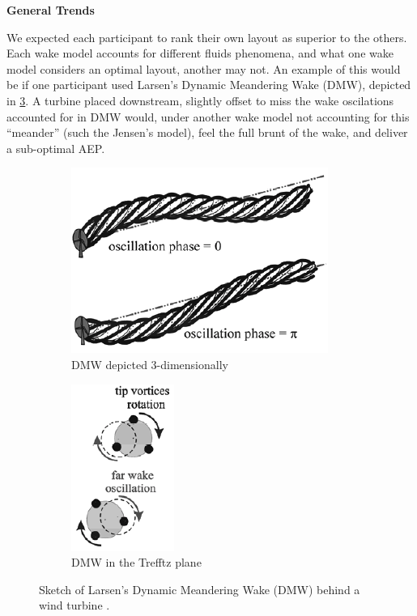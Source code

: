 \noindent\textbf{General Trends}\newline

	We expected each participant to rank their own layout as superior to the others.
	Each wake model accounts for different fluids phenomena, and what one wake model considers an optimal layout, another may not.
	An example of this would be if one participant used Larsen's Dynamic Meandering Wake (DMW)\cite{Larsen2007}, depicted in \cref{fig:dmw}.
	A turbine placed downstream, slightly offset to miss the wake oscilations accounted for in DMW would, under another wake model not accounting for this ``meander'' (such the Jensen's model\cite{Jensen1983}), feel the full brunt of the wake, and deliver a sub-optimal AEP.

	\begin{figure}[H]
		\centering
			\begin{subfigure}{.5\textwidth}
			  \centering
			  \includegraphics[width=.7\linewidth]{./figures/MeanderingWakeSpace(Larsen2007).png}
			  \caption{DMW depicted 3-dimensionally}
			  \label{fig:LarsenDMW3d}
			\end{subfigure}%
			\begin{subfigure}{.5\textwidth}
			  \centering
			  \includegraphics[width=.3\linewidth]{./figures/MeanderingWakeTrefftz(Larsen2007).png}
			  \caption{DMW in the Trefftz plane}
			  \label{fig:LarsenDMWTrefftz}
			\end{subfigure}
			\caption{Sketch of Larsen's Dynamic Meandering Wake (DMW) behind a wind turbine \cite{Larsen2007}.}
			\label{fig:dmw}
			\vspace{-10pt}
	\end{figure}

